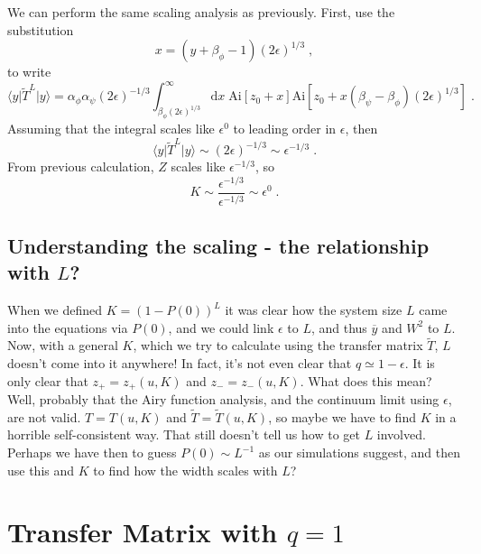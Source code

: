 \documentclass[a4paper,10pt]{article}
\newcommand{\D}{\mathrm{d}}
\newcommand{\bra}[1]{\langle #1 \vert}
\newcommand{\ket}[1]{\vert #1 \rangle}
\newcommand{\Ai}{\mathrm{Ai}}
\begin{document}
We can perform the same scaling analysis as previously. First, use the substitution
\begin{equation}
 x = (y + \beta_\phi -1)(2\epsilon)^{1/3} \;,
\end{equation}
to write
\begin{equation}
  \bra{y}\tilde{T}^L\ket{y} = \alpha_\phi\alpha_\psi (2\epsilon)^{-1/3} \int_{\beta_\phi(2\epsilon)^{1/3}}^\infty \D x \; \Ai[ z_0 + x ]\Ai[ z_0 + x (\beta_\psi - \beta_\phi)(2\epsilon)^{1/3} ] \;.
\end{equation}
Assuming that the integral scales like $\epsilon^0$ to leading order in $\epsilon$, then
\begin{equation}
  \bra{y}\tilde{T}^L\ket{y} \sim (2\epsilon)^{-1/3} \sim \epsilon^{-1/3} \;.
\end{equation}
From previous calculation, $Z$ scales like $\epsilon^{-1/3}$, so
\begin{equation}
  K \sim \frac{ \epsilon^{-1/3} }{ \epsilon^{-1/3} } \sim \epsilon^0 \;.
\end{equation}


\subsection{Understanding the scaling - the relationship with $L$?}\label{sec:K_thoughts}

When we defined $K = (1-P(0))^L$ it was clear how the system size $L$ came into the equations via $P(0)$, and we could link $\epsilon$ to $L$, and thus $\overline{y}$ and $W^2$ to $L$. Now, with a general $K$, which we try to calculate using the transfer matrix $\tilde{T}$, $L$ doesn't come into it anywhere! In fact, it's not even clear that $q \simeq 1- \epsilon$. It is only clear that $z_+ = z_+(u,K)$ and $z_- = z_-(u,K)$. What does this mean? Well, probably that the Airy function analysis, and the continuum limit using $\epsilon$, are not valid. $T = T(u,K)$ and $\tilde{T} = \tilde{T}(u,K)$, so maybe we have to find $K$ in a horrible self-consistent way. That still doesn't tell us how to get $L$ involved. Perhaps we have then to guess $P(0) \sim L^{-1}$ as our simulations suggest, and then use this and $K$ to find how the width scales with $L$?




\section{Transfer Matrix with $q=1$}
\end{document}
